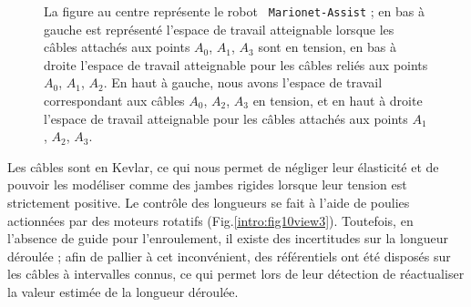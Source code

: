 \begin{figure}[!ht]
\centering
\def\svgwidth{.90\linewidth}

\caption{\footnotesize{La figure au centre représente le robot {\tt 
Marionet-Assist} ; en bas à gauche est représenté l'espace de travail 
atteignable lorsque les câbles attachés aux points $A_0$, $A_1$, $A_3$ sont en 
tension, en bas à droite l'espace de travail atteignable pour les câbles reliés 
aux points $A_0$, $A_1$, $A_2$. En haut à gauche, nous avons l'espace de travail 
correspondant aux câbles $A_0$, $A_2$, $A_3$ en tension, et en haut à droite 
l'espace de travail atteignable pour les câbles attachés aux points $A_1$, 
$A_2$, $A_3$.}}
\label{intro:fig11}
\end{figure}

Les câbles sont en Kevlar, ce qui nous permet de négliger leur élasticité et de 
pouvoir les modéliser comme des jambes rigides lorsque leur tension est 
strictement positive. Le contrôle des longueurs se fait à l'aide de poulies 
actionnées par des moteurs rotatifs (Fig.\ref{intro:fig10view3}). Toutefois, en 
l'absence de guide pour l'enroulement, il existe des incertitudes sur la 
longueur déroulée ; afin de pallier à cet inconvénient, des référentiels ont été 
disposés sur les câbles à intervalles connus, ce qui permet lors de leur 
détection de réactualiser la valeur estimée de la longueur déroulée.

